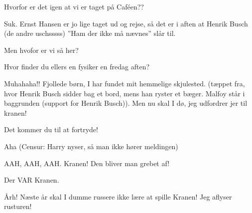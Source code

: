 \documentclass[a4paper,11pt]{article}
\begin{document}
\begin{sketch}

 Hvorfor er det igen at vi er taget på Caféen??

 Suk. Ernst Hansen er jo lige taget ud og rejse, så det er i aften at Henrik Busch (de andre uschsssss) ''Ham der ikke må nævnes'' slår til.

 Men hvofor er vi så her?

 Hvor finder du ellers en fysiker en fredag aften?

 Muhahaha!! Fjollede børn, I har fundet mit hemmelige skjulested. (tæppet fra, hvor Henrik Busch sidder bag et bord, mens han ryster et bæger. Malfoy står i baggrunden (support for Henrik Busch)). Men nu skal I dø, jeg udfordrer jer til kranen!

 Det kommer du til at fortryde!


 Aha (Censur: Harry nyser, så man ikke hører meldingen)


 AAH, AAH, AAH. Kranen! Den bliver man grebet af!


 Der VAR Kranen.

 Årh! Næste år skal I dumme russere ikke lære at spille Kranen! Jeg aflyser rusturen!

\end{sketch}
\end{document}
